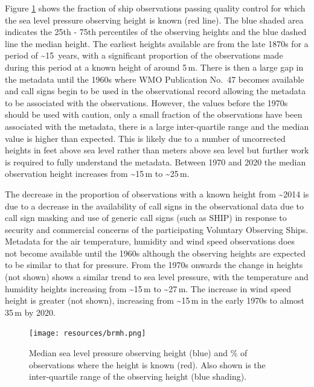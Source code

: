 Figure \ref{fig:slp_heights} shows the fraction of ship observations passing quality control for which the sea level pressure observing height is known (red line). The blue shaded area indicates the 25th - 75th percentiles of the observing heights and the blue dashed line the median height. 
The earliest heights available are from the late 1870s for a period of \sim 15~years, with a significant proportion of the observations made during this period at a known height of around 5\,m. 
There is then a large gap in the metadata until the 1960s where WMO Publication No.~47 becomes available and call signs begin to be used in the observational record allowing the metadata to be associated with the observations. 
However, the values before the 1970s should be used with caution, only a small fraction of the observations have been associated with the metadata, there is a large inter-quartile range and the median value is higher than expected.
This is likely due to a number of uncorrected heights in feet above sea level rather than meters above sea level but further work is required to fully understand the metadata.
Between 1970 and 2020 the median observation height increases from \sim 15\,m to \sim 25\,m.

The decrease in the proportion of observations with a known height from \sim 2014 is due to a decrease in the availability of call signs in the observational data due to call sign masking and use of generic call signs (such as SHIP) in response to security and commercial concerns of the participating Voluntary Observing Ships.
Metadata for the air temperature, humidity and wind speed observations does not become available until the 1960s although the observing heights are expected to be similar to that for pressure. 
From the 1970s onwards the change in heights (not shown) shows a similar trend to sea level pressure, with the temperature and humidity heights increasing from \sim 15\,m to \sim 27\,m. 
The increase in wind speed height is greater (not shown), increasing from \sim 15\,m in the early 1970s to almost 35\,m by 2020.


\begin{figure}[h]
    \texttt{[image: resources/brmh.png]}
    \caption{Median sea level pressure observing height (blue) and \% of observations where the height is known (red). Also shown is the inter-quartile range of the observing height (blue shading).\\}
    \label{fig:slp_heights}
\end{figure}


